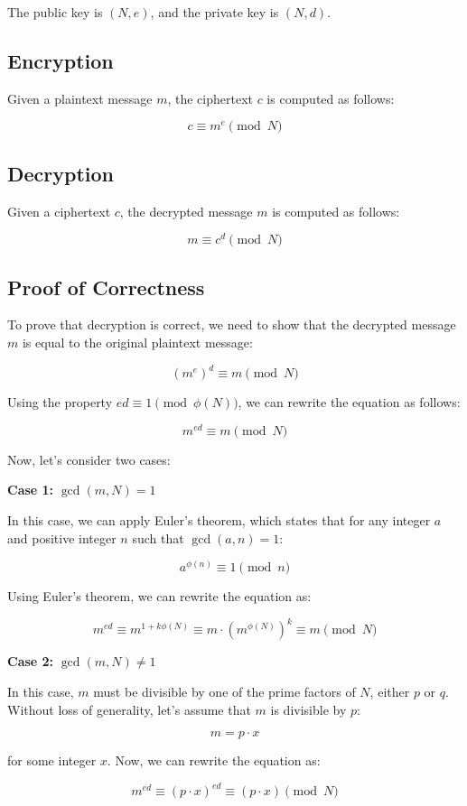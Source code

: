 \documentclass{article}
\theoremstyle{definition}
\begin{document}
The public key is $(N, e)$, and the private key is $(N, d)$.

\subsection*{Encryption}
Given a plaintext message $m$, the ciphertext $c$ is computed as follows:

\[
c \equiv m^e \pmod{N}
\]

\subsection*{Decryption}
Given a ciphertext $c$, the decrypted message $m$ is computed as follows:

\[
m \equiv c^d \pmod{N}
\]

\subsection*{Proof of Correctness}
To prove that decryption is correct, we need to show that the decrypted message $m$ is equal to the original plaintext message:

\[
(m^e)^d \equiv m \pmod{N}
\]

Using the property $ed \equiv 1 \pmod{\phi(N)}$, we can rewrite the equation as follows:

\[
m^{ed} \equiv m \pmod{N}
\]

Now, let's consider two cases:

\textbf{Case 1:} $\gcd(m, N) = 1$

In this case, we can apply Euler's theorem, which states that for any integer $a$ and positive integer $n$ such that $\gcd(a, n) = 1$:

\[
a^{\phi(n)} \equiv 1 \pmod{n}
\]

Using Euler's theorem, we can rewrite the equation as:

\[
m^{ed} \equiv m^{1 + k\phi(N)} \equiv m \cdot (m^{\phi(N)})^k \equiv m \pmod{N}
\]

\textbf{Case 2:} $\gcd(m, N) \neq 1$

In this case, $m$ must be divisible by one of the prime factors of $N$, either $p$ or $q$. Without loss of generality, let's assume that $m$ is divisible by $p$:

\[
m = p \cdot x
\]

for some integer $x$. Now, we can rewrite the equation as:

\[
m^{ed} \equiv (p \cdot x)^{ed} \equiv (p \cdot x) \pmod{N}
\]
\end{document}
